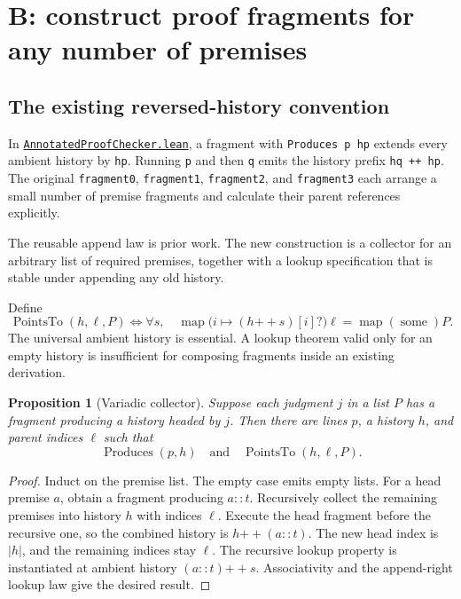 \documentclass[11pt]{article}
\newtheorem{proposition}{Proposition}[section]
\theoremstyle{remark}\newtheorem{remark}[proposition]{Remark}
\newcommand{\code}[1]{\nolinkurl{#1}}
\newcommand{\sref}[2]{\href{https://github.com/VladimirReshetnikov/ProveIt/blob/7fa06d530df54d4aeb2e18027409df082234c69e/#1}{#2}}
\newcommand{\source}[1]{\sref{Computability/DiophantineConsistency/Lean/DiophantineConsistency/#1.lean}{\code{#1.lean}}}
\begin{document}
\section{B: construct proof fragments for any number of premises}\label{sec:fragments}

\subsection{The existing reversed-history convention}

In \source{AnnotatedProofChecker}, a fragment with \code{Produces p hp} extends every ambient history by \code{hp}. Running \code{p} and then \code{q} emits the history prefix \code{hq ++ hp}. The original \code{fragment0}, \code{fragment1}, \code{fragment2}, and \code{fragment3} each arrange a small number of premise fragments and calculate their parent references explicitly.

The reusable append law is prior work. The new construction is a collector for an arbitrary list of required premises, together with a lookup specification that is stable under appending any old history.

Define
\[
 \operatorname{PointsTo}(h,\ell,P)
 \iff \forall s,\quad
 \operatorname{map}\bigl(i\mapsto(h\mathbin{+\!+}s)[i]?\bigr)\ell
 =\operatorname{map}(\operatorname{some})P.
\]
The universal ambient history is essential. A lookup theorem valid only for an empty history is insufficient for composing fragments inside an existing derivation.

\begin{proposition}[Variadic collector]
Suppose each judgment \(j\) in a list \(P\) has a fragment producing a history headed by \(j\). Then there are lines \(p\), a history \(h\), and parent indices \(\ell\) such that
\[
 \operatorname{Produces}(p,h)\quad\text{and}\quad
 \operatorname{PointsTo}(h,\ell,P).
\]
\end{proposition}

\begin{proof}
Induct on the premise list. The empty case emits empty lists. For a head premise \(a\), obtain a fragment producing \(a::t\). Recursively collect the remaining premises into history \(h\) with indices \(\ell\). Execute the head fragment before the recursive one, so the combined history is \(h\mathbin{+\!+}(a::t)\). The new head index is \(|h|\), and the remaining indices stay \(\ell\). The recursive lookup property is instantiated at ambient history \((a::t)\mathbin{+\!+}s\). Associativity and the append-right lookup law give the desired result.
\end{proof}
\end{document}
